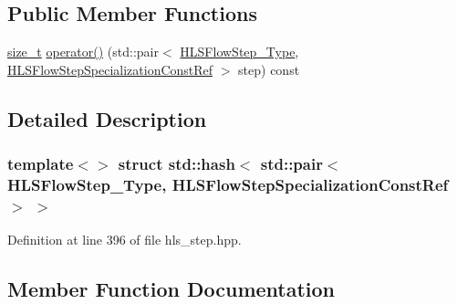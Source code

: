 \subsection*{Public Member Functions}
\begin{DoxyCompactItemize}
\item 
\hyperlink{tutorial__fpt__2017_2intro_2sixth_2test_8c_a7c94ea6f8948649f8d181ae55911eeaf}{size\+\_\+t} \hyperlink{structstd_1_1hash_3_01std_1_1pair_3_01HLSFlowStep__Type_00_01HLSFlowStepSpecializationConstRef_01_4_01_4_a12f5ff9e781f042e9eeae209f9469400}{operator()} (std\+::pair$<$ \hyperlink{hls__step_8hpp_ada16bc22905016180e26fc7e39537f8d}{H\+L\+S\+Flow\+Step\+\_\+\+Type}, \hyperlink{hls__step_8hpp_a5fdd2edf290c196531d21d68e13f0e74}{H\+L\+S\+Flow\+Step\+Specialization\+Const\+Ref} $>$ step) const
\end{DoxyCompactItemize}


\subsection{Detailed Description}
\subsubsection*{template$<$$>$\newline
struct std\+::hash$<$ std\+::pair$<$ H\+L\+S\+Flow\+Step\+\_\+\+Type, H\+L\+S\+Flow\+Step\+Specialization\+Const\+Ref $>$ $>$}



Definition at line 396 of file hls\+\_\+step.\+hpp.



\subsection{Member Function Documentation}
\mbox{\label{structstd_1_1hash_3_01std_1_1pair_3_01HLSFlowStep__Type_00_01HLSFlowStepSpecializationConstRef_01_4_01_4_a12f5ff9e781f042e9eeae209f9469400}} 
